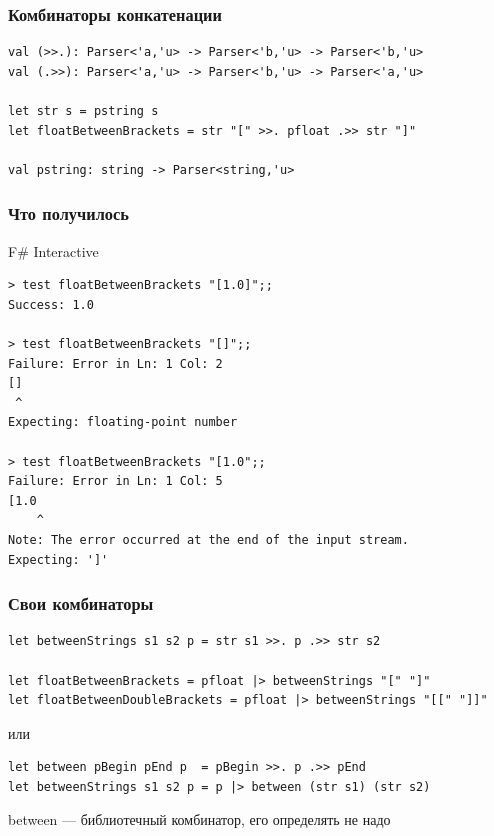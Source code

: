 \documentclass[xetex,mathserif,serif]{beamer}
\begin{document}
    \begin{frame}[fragile]
        \frametitle{Комбинаторы конкатенации}
        \begin{verbatim}
val (>>.): Parser<'a,'u> -> Parser<'b,'u> -> Parser<'b,'u>
val (.>>): Parser<'a,'u> -> Parser<'b,'u> -> Parser<'a,'u>

let str s = pstring s
let floatBetweenBrackets = str "[" >>. pfloat .>> str "]"

val pstring: string -> Parser<string,'u>
        \end{verbatim}
    \end{frame}

    \begin{frame}[fragile]
        \frametitle{Что получилось}
        \begin{small}
            \begin{alertblock}{F\# Interactive}
                \begin{verbatim}
> test floatBetweenBrackets "[1.0]";;
Success: 1.0

> test floatBetweenBrackets "[]";;
Failure: Error in Ln: 1 Col: 2
[]
 ^
Expecting: floating-point number

> test floatBetweenBrackets "[1.0";;
Failure: Error in Ln: 1 Col: 5
[1.0
    ^
Note: The error occurred at the end of the input stream.
Expecting: ']'
                \end{verbatim}
            \end{alertblock}
        \end{small}
    \end{frame}

    \begin{frame}[fragile]
        \frametitle{Свои комбинаторы}
        \begin{verbatim}
let betweenStrings s1 s2 p = str s1 >>. p .>> str s2

let floatBetweenBrackets = pfloat |> betweenStrings "[" "]"
let floatBetweenDoubleBrackets = pfloat |> betweenStrings "[[" "]]"
        \end{verbatim}

        или

        \begin{verbatim}
let between pBegin pEnd p  = pBegin >>. p .>> pEnd
let betweenStrings s1 s2 p = p |> between (str s1) (str s2)
        \end{verbatim}

        between --- библиотечный комбинатор, его определять не надо
    \end{frame}
\end{document}
